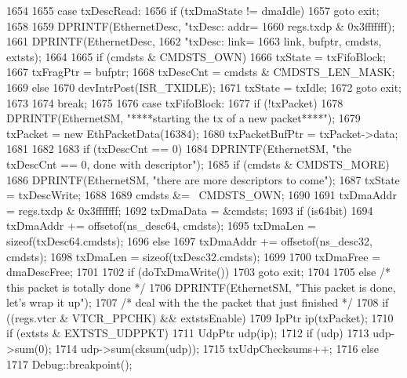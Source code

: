 \begin{DoxyCode}
{{1654 
1655       case txDescRead:
1656         if (txDmaState != dmaIdle)
1657             goto exit;
1658 
1659         DPRINTF(EthernetDesc, "txDesc: addr=%
1660                 regs.txdp & 0x3fffffff);
1661         DPRINTF(EthernetDesc,
1662                 "txDesc: link=%
1663                 link, bufptr, cmdsts, extsts);
1664 
1665         if (cmdsts & CMDSTS_OWN) {
1666             txState = txFifoBlock;
1667             txFragPtr = bufptr;
1668             txDescCnt = cmdsts & CMDSTS_LEN_MASK;
1669         } else {
1670             devIntrPost(ISR_TXIDLE);
1671             txState = txIdle;
1672             goto exit;
1673         }
1674         break;
1675 
1676       case txFifoBlock:
1677         if (!txPacket) {
1678             DPRINTF(EthernetSM, "****starting the tx of a new packet****\n");
1679             txPacket = new EthPacketData(16384);
1680             txPacketBufPtr = txPacket->data;
1681         }
1682 
1683         if (txDescCnt == 0) {
1684             DPRINTF(EthernetSM, "the txDescCnt == 0, done with descriptor\n");
1685             if (cmdsts & CMDSTS_MORE) {
1686                 DPRINTF(EthernetSM, "there are more descriptors to come\n");
1687                 txState = txDescWrite;
1688 
1689                 cmdsts &= ~CMDSTS_OWN;
1690 
1691                 txDmaAddr = regs.txdp & 0x3fffffff;
1692                 txDmaData = &cmdsts;
1693                 if (is64bit) {
1694                     txDmaAddr += offsetof(ns_desc64, cmdsts);
1695                     txDmaLen = sizeof(txDesc64.cmdsts);
1696                 } else {
1697                     txDmaAddr += offsetof(ns_desc32, cmdsts);
1698                     txDmaLen = sizeof(txDesc32.cmdsts);
1699                 }
1700                 txDmaFree = dmaDescFree;
1701 
1702                 if (doTxDmaWrite())
1703                     goto exit;
1704 
1705             } else { /* this packet is totally done */
1706                 DPRINTF(EthernetSM, "This packet is done, let's wrap it up\n");
1707                 /* deal with the the packet that just finished */
1708                 if ((regs.vtcr & VTCR_PPCHK) && extstsEnable) {
1709                     IpPtr ip(txPacket);
1710                     if (extsts & EXTSTS_UDPPKT) {
1711                         UdpPtr udp(ip);
1712                         if (udp) {
1713                             udp->sum(0);
1714                             udp->sum(cksum(udp));
1715                             txUdpChecksums++;
1716                         } else {
1717                             Debug::breakpoint();
}}}}}}}
\end{DoxyCode}
